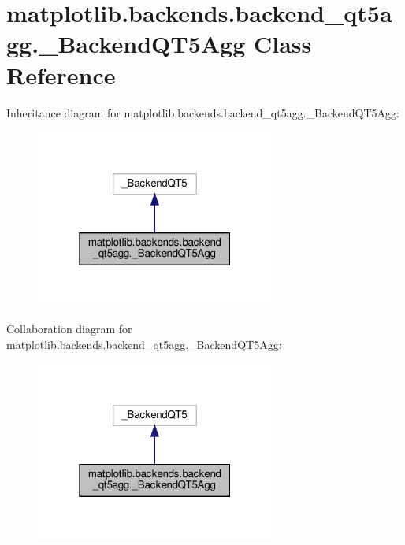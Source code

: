 \hypertarget{classmatplotlib_1_1backends_1_1backend__qt5agg_1_1__BackendQT5Agg}{}\section{matplotlib.\+backends.\+backend\+\_\+qt5agg.\+\_\+\+Backend\+Q\+T5\+Agg Class Reference}
\label{classmatplotlib_1_1backends_1_1backend__qt5agg_1_1__BackendQT5Agg}


Inheritance diagram for matplotlib.\+backends.\+backend\+\_\+qt5agg.\+\_\+\+Backend\+Q\+T5\+Agg\+:
\nopagebreak
\begin{figure}[H]
\begin{center}
\leavevmode
\includegraphics[width=223pt]{classmatplotlib_1_1backends_1_1backend__qt5agg_1_1__BackendQT5Agg__inherit__graph}
\end{center}
\end{figure}


Collaboration diagram for matplotlib.\+backends.\+backend\+\_\+qt5agg.\+\_\+\+Backend\+Q\+T5\+Agg\+:
\nopagebreak
\begin{figure}[H]
\begin{center}
\leavevmode
\includegraphics[width=223pt]{classmatplotlib_1_1backends_1_1backend__qt5agg_1_1__BackendQT5Agg__coll__graph}
\end{center}
\end{figure}
